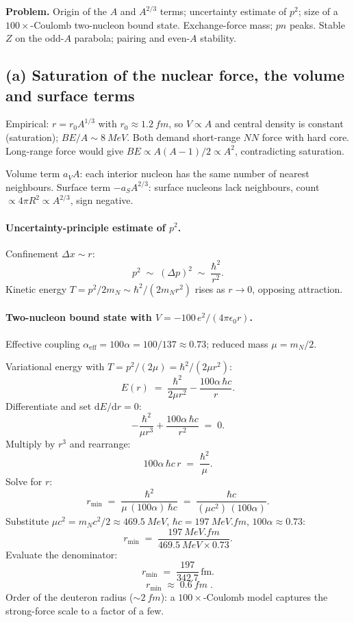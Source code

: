\documentclass[11pt]{article}
\newcommand{\de}{\mathrm{d}}
\begin{document}
\textbf{Problem.} Origin of the $A$ and $A^{2/3}$ terms; uncertainty estimate of $p^{2}$; size of a $100\times$-Coulomb two-nucleon bound state. Exchange-force mass; $pn$ peaks. Stable $Z$ on the odd-$A$ parabola; pairing and even-$A$ stability.

\subsection*{(a) Saturation of the nuclear force, the volume and surface terms}

Empirical: $r=r_{0}A^{1/3}$ with $r_{0}\approx\SI{1.2}{fm}$, so $V\propto A$ and central density is constant (saturation); $BE/A\sim\SI{8}{MeV}$. Both demand short-range $NN$ force with hard core. Long-range force would give $BE\propto A(A-1)/2\propto A^{2}$, contradicting saturation.

Volume term $a_{V}A$: each interior nucleon has the same number of nearest neighbours.
Surface term $-a_{S}A^{2/3}$: surface nucleons lack neighbours, count $\propto 4\pi R^{2}\propto A^{2/3}$, sign negative.

\paragraph{Uncertainty-principle estimate of $p^{2}$.} Confinement $\Delta x\sim r$:
\begin{equation}
p^{2}\;\sim\;(\Delta p)^{2}\;\sim\;\frac{\hbar^{2}}{r^{2}}.
\label{eq:HUP}
\end{equation}
Kinetic energy $T=p^{2}/2m_{N}\sim\hbar^{2}/(2m_{N}r^{2})$ rises as $r\to 0$, opposing attraction.

\paragraph{Two-nucleon bound state with $V=-100\,e^{2}/(4\pi\epsilon_{0}r)$.} Effective coupling $\alpha_\text{eff}=100\alpha=100/137\approx 0.73$; reduced mass $\mu=m_{N}/2$.

Variational energy with $T=p^{2}/(2\mu)=\hbar^{2}/(2\mu r^{2})$:
\[
E(r)\;=\;\frac{\hbar^{2}}{2\mu r^{2}}-\frac{100\alpha\,\hbar c}{r}.
\]
Differentiate and set $\de E/\de r=0$:
\[
-\frac{\hbar^{2}}{\mu r^{3}}+\frac{100\alpha\,\hbar c}{r^{2}}\;=\;0.
\]
Multiply by $r^{3}$ and rearrange:
\[
100\alpha\,\hbar c\,r\;=\;\frac{\hbar^{2}}{\mu}.
\]
Solve for $r$:
\[
r_{\min}\;=\;\frac{\hbar^{2}}{\mu\,(100\alpha)\,\hbar c}\;=\;\frac{\hbar c}{(\mu c^{2})\,(100\alpha)}.
\]
Substitute $\mu c^{2}=m_{N}c^{2}/2\approx\SI{469.5}{MeV}$, $\hbar c=\SI{197}{MeV.fm}$, $100\alpha\approx 0.73$:
\[
r_{\min}\;=\;\frac{\SI{197}{MeV.fm}}{\SI{469.5}{MeV}\times 0.73}.
\]
Evaluate the denominator:
\[
r_{\min}\;=\;\frac{197}{342.7}\,\text{fm}.
\]
\begin{equation}
\boxed{\;r_{\min}\;\approx\;\SI{0.6}{fm}\;.}
\label{eq:rmin-final}
\end{equation}
Order of the deuteron radius ($\sim\SI{2}{fm}$): a $100\times$-Coulomb model captures the strong-force scale to a factor of a few.
\end{document}
